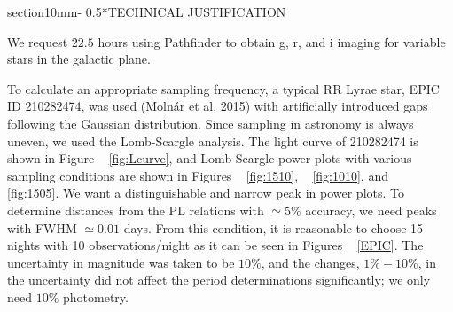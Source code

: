 \documentclass[letterpaper,11pt]{article}
\makeatletter
\renewcommand{\section}{\@startsection%
{section}{1}{0mm}{-\baselineskip}%
{0.5\baselineskip}{\normalfont\Large\bfseries}}%
\makeatother
\begin{document}
\noindent{}

\noindent{}

\noindent{}

\noindent{}

\noindent{}

\noindent{}


\clearpage
\section*{TECHNICAL JUSTIFICATION}


We request $22.5$ hours using Pathfinder to obtain g, r, and i imaging for variable stars in the galactic plane.

\vspace{3mm} %

\noindent To calculate an appropriate sampling frequency, a typical RR Lyrae star, EPIC ID 210282474, was used (Molnár et al. 2015) with artificially introduced gaps following the Gaussian distribution. Since sampling in astronomy is always uneven, we used the Lomb-Scargle analysis. The light curve of 210282474 is shown in Figure ~ \ref{fig:Lcurve}, and Lomb-Scargle power plots with various sampling conditions are shown in Figures ~ \ref{fig:1510}, ~ \ref{fig:1010}, and ~ \ref{fig:1505}. We want a distinguishable and narrow peak in power plots. To determine distances from the PL relations with $\simeq5\%$ accuracy, we need peaks with FWHM $ \simeq 0.01$ days. From this condition, it is reasonable to choose 15 nights with 10 observations/night as it can be seen in Figures ~ \ref{EPIC}. The uncertainty in magnitude was taken to be $10\%$, and the changes, $1\% - 10\%$, in the uncertainty did not affect the period determinations significantly; we only need $10\%$ photometry.
\end{document}
